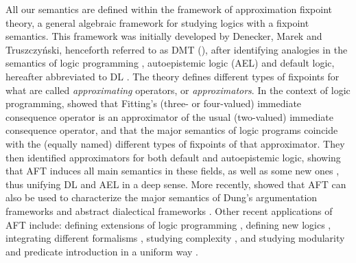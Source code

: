 All our semantics are defined within the framework of approximation fixpoint theory, a general algebraic framework for studying logics with a fixpoint semantics.
This framework was initially developed by Denecker, Marek and Truszczy\'nski, henceforth referred to as DMT (\citeyear{DeneckerMT00}), after identifying analogies in the semantics of logic programming , autoepistemic logic (AEL) \cite{mo85} and default logic, hereafter abbreviated to DL \cite{ai/Reiter80}.
The theory defines different types of fixpoints for what are called \emph{approximating} operators, or \emph{approximators}.
In the context of logic programming,  showed that Fitting's (three- or four-valued) immediate consequence operator is an approximator of the usual (two-valued) immediate consequence operator, and that the major semantics of logic programs coincide with the (equally named) different types of fixpoints of that approximator.
They then identified approximators for both default and autoepistemic logic, showing that AFT induces all main semantics in these fields, as well as some new ones \cite{DeneckerMT03}, thus unifying DL and AEL in a deep sense.
More recently, \citet{journals/ai/Strass13} showed that AFT can also be used to characterize the major semantics of Dung's argumentation frameworks  and abstract dialectical frameworks .
Other recent applications of AFT include: defining extensions of logic programming \cite{lpnmr/AnticEF13}, defining new logics \cite{iclp/BogaertsVDV14}, integrating different formalisms \cite{RR/BiJF14}, studying complexity \cite{kr/StrassW14}, and studying modularity and predicate introduction in a uniform way \cite{tocl/VennekensGD06,VennekensMWD07a,VennekensMWD07b}. 


